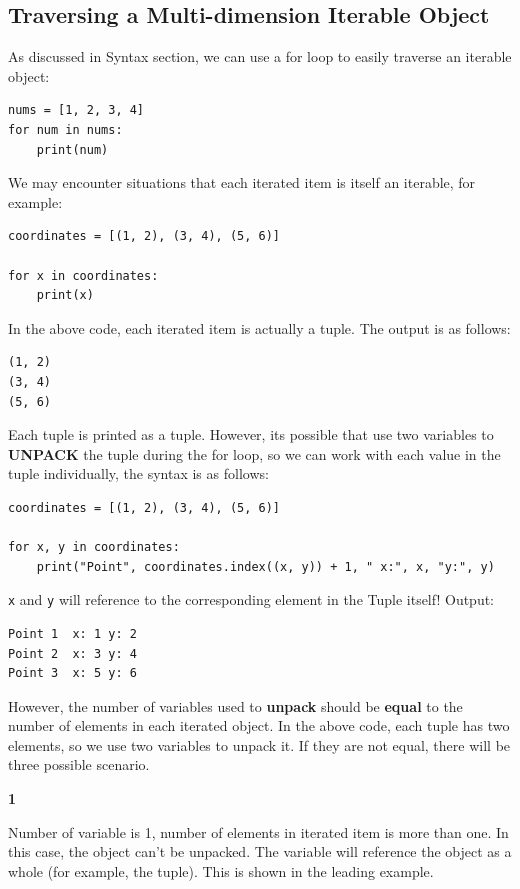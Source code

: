 \documentclass[12pt]{book}
\begin{document}
\subsection{Traversing a Multi-dimension Iterable Object}
\label{sec:orgd8b2aac}
As discussed in Syntax section, we can use a for loop to easily traverse an iterable object:
\begin{verbatim}
nums = [1, 2, 3, 4]
for num in nums:
    print(num)
\end{verbatim}

We may encounter situations that each iterated item is itself an iterable, for example:
\begin{verbatim}
coordinates = [(1, 2), (3, 4), (5, 6)]

for x in coordinates:
    print(x)
\end{verbatim}
In the above code, each iterated item is actually a tuple. The output is as follows:
\begin{verbatim}
(1, 2)
(3, 4)
(5, 6)
\end{verbatim}
Each tuple is printed as a tuple. However, its possible that use two variables to \textbf{UNPACK} the tuple during the for loop, so we can work with each value in the tuple individually, the syntax is as follows:
\begin{verbatim}
coordinates = [(1, 2), (3, 4), (5, 6)]

for x, y in coordinates:
    print("Point", coordinates.index((x, y)) + 1, " x:", x, "y:", y)
\end{verbatim}
\texttt{x} and \texttt{y} will reference to the corresponding element in the Tuple itself! Output:
\begin{verbatim}
Point 1  x: 1 y: 2
Point 2  x: 3 y: 4
Point 3  x: 5 y: 6
\end{verbatim}

However, the number of variables used to \textbf{unpack} should be \textbf{equal} to the number of elements in each iterated object. In the above code, each tuple has two elements, so we use two variables to unpack it. If they are not equal, there will be three possible scenario.

\textbf{1}

Number of variable is 1, number of elements in iterated item is more than one. In this case, the object can't be unpacked. The variable will reference the object as a whole (for example, the tuple). This is shown in the leading example.
\end{document}
